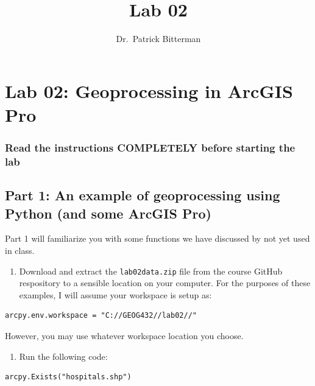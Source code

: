 \documentclass[
]{article}
\title{Lab 02}
\author{Dr.~Patrick Bitterman}
\date{}
\providecommand{\tightlist}{%
  \setlength{\itemsep}{0pt}\setlength{\parskip}{0pt}}
\begin{document}
\maketitle

\hypertarget{lab-02-geoprocessing-in-arcgis-pro}{%
\section{Lab 02: Geoprocessing in ArcGIS
Pro}\label{lab-02-geoprocessing-in-arcgis-pro}}

\hypertarget{read-the-instructions-completely-before-starting-the-lab}{%
\subsubsection{Read the instructions COMPLETELY before starting the
lab}\label{read-the-instructions-completely-before-starting-the-lab}}

\hypertarget{part-1-an-example-of-geoprocessing-using-python-and-some-arcgis-pro}{%
\subsection{Part 1: An example of geoprocessing using Python (and some
ArcGIS
Pro)}\label{part-1-an-example-of-geoprocessing-using-python-and-some-arcgis-pro}}

Part 1 will familiarize you with some functions we have discussed by not
yet used in class.

\begin{enumerate}
\def\labelenumi{\arabic{enumi}.}
\tightlist
\item
  Download and extract the \texttt{lab02data.zip} file from the course
  GitHub respository to a sensible location on your computer. For the
  purposes of these examples, I will assume your workspace is setup as:
\end{enumerate}

\begin{verbatim}
arcpy.env.workspace = "C://GEOG432//lab02//"
\end{verbatim}

However, you may use whatever workspace location you choose.

\begin{enumerate}
\def\labelenumi{\arabic{enumi}.}
\tightlist
\item
  Run the following code:
\end{enumerate}

\begin{verbatim}
arcpy.Exists("hospitals.shp")
\end{verbatim}
\end{document}
